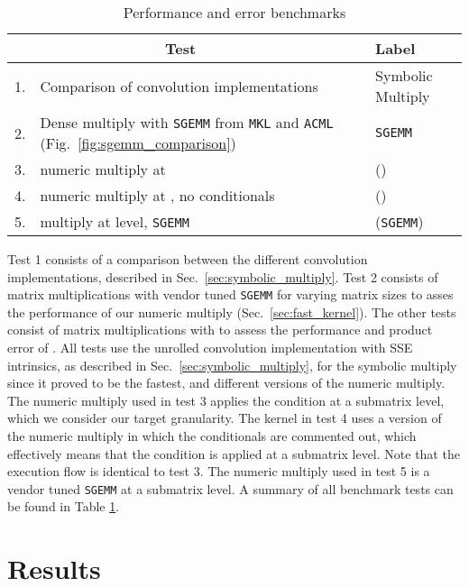\begin{table}
\caption{\label{table:benchmarks} Performance and error benchmarks}
\begin{center}
\begin{tabular}{rp{}ll}
\hline
\hline
\multicolumn{2}{c}{Test} & \hspace{0.2cm} & Label \\
\hline
1.
  & Comparison of convolution implementations
  &
  & Symbolic Multiply \\
2.
  & Dense multiply with {\tt SGEMM} from {\tt MKL} and {\tt ACML}
  (Fig.~\ref{fig:sgemm_comparison})
  &
  & {\tt SGEMM} \\
3.
  & \SpAMM{} numeric multiply at 
  &
  & \SpAMM{}() \\
4.
  & \SpAMM{} numeric multiply at , no conditionals
  &
  & \SpAMM{}() \\
5.
  & \SpAMM{} multiply at  level, {\tt SGEMM}
  &
  & \SpAMM{}({\tt SGEMM}) \\
\hline
\hline
\end{tabular}
\end{center}
\end{table}

Test 1 consists of a comparison between the different convolution
implementations, described in Sec.~\ref{sec:symbolic_multiply}.  Test 2
consists of matrix multiplications with vendor tuned {\tt SGEMM} for varying
matrix sizes to asses the performance of our numeric multiply
(Sec.~\ref{sec:fast_kernel}).  The other tests consist of matrix
multiplications with \SpAMM{} to assess the performance and product error of
\SpAMM{}. All \SpAMM{} tests use the unrolled convolution implementation with
SSE intrinsics, as described in Sec.~\ref{sec:symbolic_multiply}, for the
symbolic multiply since it proved to be the fastest, and different versions of
the numeric multiply. The numeric multiply used in test 3 applies the \SpAMM{}
condition at a  submatrix level, which we consider our target
granularity. The kernel in test 4 uses a version of the numeric multiply in
which the \SpAMM{} conditionals are commented out, which effectively means
that the \SpAMM{} condition is applied at a  submatrix level.
Note that the execution flow is identical to test 3. The numeric multiply used
in test 5 is a vendor tuned {\tt SGEMM} at a  submatrix level. A
summary of all benchmark tests can be found in Table \ref{table:benchmarks}.

\section{Results}
\label{sec:results}

